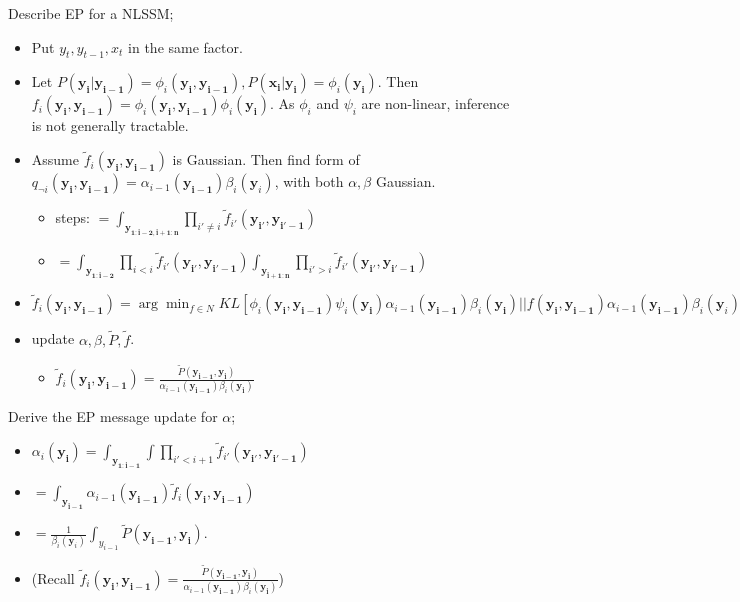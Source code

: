 \documentclass{article}
\begin{document}
Describe EP for a NLSSM; \begin{itemize} \item Put $y_t, y_{t-1}, x_t$ in the same factor. \item Let $P(\mathbf{y_i|y_{i-1}}) = \phi_i(\mathbf{y_i, y_{i-1}}), P(\mathbf{x_i|y_i}) = \phi_i(\mathbf{y_i})$. Then $f_i(\mathbf{y_i, y_{i-1}}) = \phi_i(\mathbf{y_i, y_{i-1}})\phi_i(\mathbf{y_i})$. As $\phi_i$ and $\psi_i$ are non-linear, inference is not generally tractable. \item Assume $\tilde{f}_i(\mathbf{y_i, y_{i-1}})$ is Gaussian. Then find form of $q_{\neg i}(\mathbf{y_i, y_{i-1}}) = \alpha_{i-1}(\mathbf{y_{i-1}})\beta_i(\mathbf{y}_i)$, with both $\alpha, \beta$ Gaussian. \begin{itemize} \item steps: $=\int_{\mathbf{y_{1:i-2, i+1:n}}} \prod_{i'\ne i}\tilde{f}_{i'}(\mathbf{y_{i'}, y_{i'-1}})$ \item $=\int_{\mathbf{y_{1:i-2}}} \prod_{i< i}\tilde{f}_{i'}(\mathbf{y_{i'}, y_{i'-1}}) \int_{\mathbf{y_{i+1:n}}} \prod_{i'> i}\tilde{f}_{i'}(\mathbf{y_{i'}, y_{i'-1}})$ \end{itemize} \item $\tilde{f}_i(\mathbf{y_i, y_{i-1}}) = \arg\min_{f\in N} KL[\phi_i(\mathbf{y_i, y_{i-1}})\psi_i(\mathbf{y_i})\alpha_{i-1}(\mathbf{y_{i-1}})\beta_i(\mathbf{y_i}) || f(\mathbf{y_i, y_{i-1}})\alpha_{i-1}(\mathbf{y_{i-1}})\beta_i(\mathbf{y}_i)]$ \item update $\alpha, \beta, \tilde{P}, \tilde{f}$. \begin{itemize} \item $\tilde{f}_i(\mathbf{y_i, y_{i-1}}) = \frac{\tilde{P}(\mathbf{y_{i-1}, y_i})}{\alpha_{i-1}(\mathbf{y_{i-1}})\beta_i(\mathbf{y_i})}$ \end{itemize}  \end{itemize}

Derive the EP message update for $\alpha$; \begin{itemize} \item $\alpha_i(\mathbf{y_i}) = \int_{\mathbf{y_{1:i-1}}} \int \prod_{i'<i+1} \tilde{f}_{i'}(\mathbf{y_{i'}, \mathbf{y}_{i'-1}})  $ \item $= \int_{\mathbf{y_{i-1}}}\alpha_{i-1}(\mathbf{y_{i-1}})\tilde{f}_i(\mathbf{y_i, y_{i-1}})$ \item $= \frac{1}{\beta_i(\mathbf{y}_i)}\int_{y_{i-1}}\tilde{P}(\mathbf{y_{i-1},y_i})$. \item (Recall $\tilde{f}_i(\mathbf{y_i, y_{i-1}}) = \frac{\tilde{P}(\mathbf{y_{i-1}, y_i})}{\alpha_{i-1}(\mathbf{y_{i-1}})\beta_i(\mathbf{y_i})}$) \end{itemize} 
\end{document}
